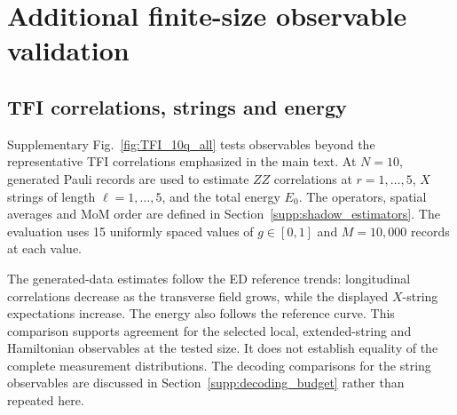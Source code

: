 \documentclass[11pt,a4paper]{article}
\newcommand{\TBD}[1]{\textcolor{red!70!black}{\textsf{[TBD: #1]}}}
\newcommand{\sechead}[2]{\section{#2}}
\newcommand{\subhead}[1]{\subsection*{#1}}
\begin{document}
\sechead{S6}{Additional finite-size observable validation}
\label{supp:additional_validation}

\subhead{TFI correlations, strings and energy}
Supplementary Fig.~\ref{fig:TFI_10q_all} tests observables beyond the representative TFI
correlations emphasized in the main text. At $N=10$, generated Pauli
records are used to estimate $ZZ$ correlations at $r=1,\ldots,5$,
$X$ strings of length $\ell=1,\ldots,5$, and the total energy $E_0$.
The operators, spatial averages and MoM order are defined in Section~\ref{supp:shadow_estimators}.
The evaluation uses 15 uniformly spaced values of $g\in[0,1]$ and
$M=10{,}000$ records at each value. 

The generated-data estimates follow the ED reference trends: longitudinal
correlations decrease as the transverse field grows, while the displayed
$X$-string expectations increase. The energy also follows the reference
curve. This comparison supports agreement for the selected local,
extended-string and Hamiltonian observables at the tested size. It does
not establish equality of the complete measurement distributions.
The decoding comparisons for the string observables are discussed in
Section~\ref{supp:decoding_budget} rather than repeated here.





\end{document}

